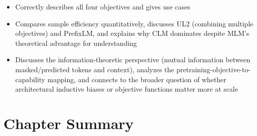\begin{interviewq}

\goodgreat
\begin{itemize}
    \item {} Correctly describes all four objectives and gives use cases
    \item {} Compares sample efficiency quantitatively, discusses UL2
          (combining multiple objectives) and PrefixLM, and explains why CLM dominates
          despite MLM's theoretical advantage for understanding
    \item {} Discusses the information-theoretic perspective (mutual
          information between masked/predicted tokens and context), analyzes the
          pretraining-objective-to-capability mapping, and connects to the broader
          question of whether architectural inductive biases or objective functions
          matter more at scale
\end{itemize}

\end{interviewq}


\section*{Chapter Summary}

